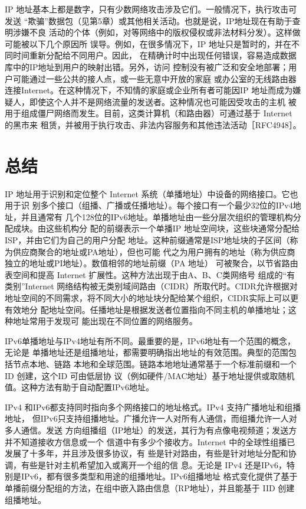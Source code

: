 IP 地址基本上都是数字，只有少数网络攻击涉及它们。一般情况下，执行攻击可发送
“欺骗”数据包（见第5章）或其他相关活动。也就是说，IP地址现在有助于查明涉嫌不良
活动的个体（例如，对等网络中的版权侵权或非法材料分发）。这样做可能被以下几个原因所
误导。例如，在很多情况下，IP 地址只是暂时的，并在不同时间重新分配给不同用户。因此，
在精确计时中出现任何错误，容易造成数据库中的IP地址到用户的映射出错。另外，访问
控制没有被广泛和安全地部署；用户可能通过一些公共的接人点，或一些无意中开放的家庭
或办公室的无线路由器连接Internet。在这种情况下，不知情的家庭或企业所有者可能因IP
地址而成为嫌疑人，即使这个人并不是网络流量的发送者。这种情况也可能因受攻击的主机
被用于组成僵尸网络而发生。目前，这类计算机（和路由器）可通过基于 Internet 的黑市来
租赁，并被用于执行攻击、非法内容服务和其他违法活动［RFC4948］。

\section{总结}

IP 地址用于识别和定位整个 Internet 系统（单播地址）中设备的网络接口。它也用于识
别多个接口（组播、广播或任播地址）。每个接口有一个最少32位的IPv4地址，并且通常有
几个128位的IPv6地址。单播地址由一些分层次组织的管理机构分配成块。由这些机构分
配的前缀表示一个单播IP 地址空间块，这些块通常分配给ISP，并由它们为自己的用户分配
地址。这种前缀通常是ISP地址块的子区间（称为供应商聚合的地址或PA地址），但也可能
代之为用户拥有的地址（称为供应商独立的地址或PI地址）。数值相邻的地址前缀（PA 地址）
可被聚合，以节省路由表空间和提高 Internet 扩展性。这种方法出现于由A、B、C类网络号
组成的“有类别”Internet 网络结构被无类别域间路由（CIDR）所取代时。CIDR允许根据对
地址空间的不同需求，将不同大小的地址块分配给某个组织，CIDR实际上可以更有效地分
配地址空间。任播地址是根据发送者位置指向不同主机的单播地址；这种地址常用于发现可
能出现在不同位置的网络服务。

IPv6单播地址与IPv4地址有所不同。最重要的是，IPv6地址有一个范围的概念，无论是
单播地址还是组播地址，都需要明确指出地址的有效范围。典型的范围包括节点本地、链路
本地和全球范围。链路本地地址通常基于一个标准前缀和一个ID 创建，这个ID 可由低层协
议（例如硬件/MAC地址）基于地址提供或取随机值。这种方法有助于自动配置IPv6地址。

IPv4 和IPv6都支持同时指向多个网络接口的地址格式。IPv4 支持广播地址和组播地址，
但IPv6只支持组播地址。广播允许一人对所有人通信，而组播允许一人对多人通信。发送
方向组播组（IP地址）的发送，其行为有点像电视频道；发送方并不知道接收方信息或一个
信道中有多少个接收方。Internet 中的全球性组播已发展了十多年，并且涉及很多协议，有
些是针对路由，有些是针对地址分配和协调，有些是针对主机希望加入或离开一个组的信
息。无论是 IPv4 还是IPv6，特别是IPv6，都有很多类型和用途的组播地址。IPv6组播地址
格式变化提供了基于单播前缀分配组的方法，在组中嵌入路由信息（RP地址），并且能基于
IID 创建组播地址。

